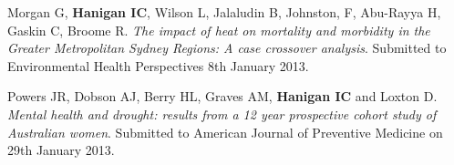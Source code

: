 \documentclass[a4paper,11pt]{article}
\begin{document}
\medskip
\renewcommand{\labelenumi}{\textsc{b}\theenumi.}
\begin{revnumerate}
\item Morgan G, \textbf{Hanigan IC}, Wilson L, Jalaludin B, Johnston, F, Abu-Rayya H, Gaskin C, Broome R. \emph{The impact of heat on mortality and morbidity in the Greater Metropolitan Sydney Regions: A case crossover analysis}.  Submitted to Environmental Health Perspectives 8th January 2013.

\item Powers JR, Dobson AJ, Berry HL, Graves AM, \textbf{Hanigan IC} and Loxton D. \emph{Mental health and drought: results from a 12 year prospective cohort study of Australian women}. Submitted to American Journal of Preventive Medicine on 29th January 2013. 


\end{revnumerate}
\end{document}
